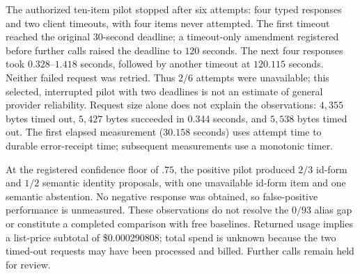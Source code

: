 The authorized ten-item pilot stopped after six attempts: four typed responses
and two client timeouts, with four items never attempted. The first timeout
reached the original $30$-second deadline; a timeout-only amendment registered
before further calls raised the deadline to $120$ seconds. The next four
responses took $0.328$--$1.418$ seconds, followed by another timeout at
$120.115$ seconds. Neither failed request was retried. Thus $2/6$ attempts
were unavailable; this selected, interrupted pilot with two deadlines is not
an estimate of general provider reliability. Request size alone does not explain
the observations: $4{,}355$ bytes timed out, $5{,}427$ bytes succeeded in
$0.344$ seconds, and $5{,}538$ bytes timed out. The first elapsed measurement
($30.158$ seconds) uses attempt time to durable error-receipt time; subsequent
measurements use a monotonic timer.

At the registered confidence floor of $.75$, the positive pilot produced
$2/3$ id-form and $1/2$ semantic identity proposals, with one unavailable
id-form item and one semantic abstention. No negative response was obtained,
so false-positive performance is unmeasured. These observations do not resolve
the $0/93$ alias gap or constitute a completed comparison with free baselines.
Returned usage implies a list-price subtotal of \$0.000290808; total spend is
unknown because the two timed-out requests may have been processed and billed.
Further calls remain held for review.
